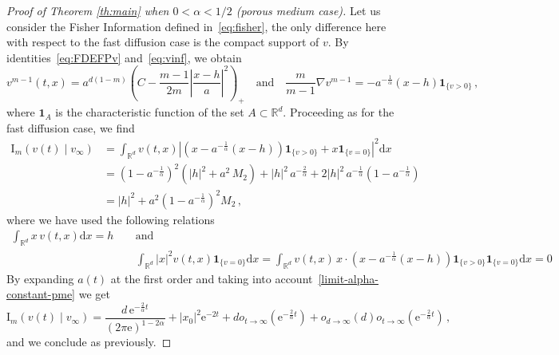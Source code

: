 \documentclass[10pt,reqno]{amsart}
\numberwithin{equation}{section}
\begin{document}
\begin{proof}[Proof of Theorem \ref{th:main} when $0<\alpha<1/2$ (porous medium case)]
Let us consider the Fisher Information defined in~\eqref{eq:fisher}, the only difference here with respect to the fast diffusion case is the compact support of $v$. By identities~\eqref{eq:FDEFPv} and~\eqref{eq:vinf}, we obtain
\begin{equation*}
    v^{m-1}(t,x)=a^{d(1-m)}\left(C-\frac{m-1}{2m}\left|\frac{x-h}{a}\right|^2\right)_{+}\quad\mbox{and}\quad \frac{m}{m-1}\nabla v^{m-1} =-a^{-\frac{1}{\alpha}}\left(x-h\right) \mathbf{1}_{\{v>0\}}\,,
\end{equation*}
where $\mathbf{1}_A$ is the characteristic function of the set $A\subset \mathbb{R}^d$. Proceeding as for the fast diffusion case, we find
\begin{equation*}
    \begin{split}
         \mathrm{I}_m(v(t)\mid v_\infty) & =\int_{\mathbb{R}^d}v(t,x) \left|\left(x-a^{-\frac{1}{\alpha}}(x-h)\right) \mathbf{1}_{\{v>0\}} + x\mathbf{1}_{\{v=0\}} \right|^2 \mathrm{d}x 
          \\ & = (1-a^{-\frac{1}{\alpha}})^2\left(|h|^2 + a^2\, M_2\right) + |h|^2\,a^{-\frac{2}{\alpha}} +2 |h|^2\,a^{-\frac{1}{\alpha}} (1-a^{-\frac{1}{\alpha}})  \\
          & = |h|^2 + a^2 (1-a^{-\frac{1}{\alpha}})^2 M_2\,,
    \end{split}
\end{equation*}
where we have used the following relations
\begin{equation*}
\begin{split}
\int_{\mathbb{R}^d} x\,v(t,x) \mathrm{d}x = h\,\quad&\mbox{and} \\ &\int_{\mathbb{R}^d} |x|^2 v(t,x) \mathbf{1}_{\{v=0\}} \mathrm{d}x = \int_{\mathbb{R}^d} v(t,x) \, x\cdot \left(x-a^{-\frac{1}{\alpha}}(x-h)\right) \mathbf{1}_{\{v>0\}}\mathbf{1}_{\{v=0\}} \mathrm{d}x =   0
\end{split}
\end{equation*}
By expanding $a(t)$ at the first order and taking into account~\eqref{limit-alpha-constant-pme} we get
 \begin{equation*}
      \mathrm{I}_m(v(t)\mid v_\infty) = \frac{d\,\mathrm{e}^{-\frac{2}{\alpha}t}}{(2\pi\mathrm{e})^{1-2\alpha}} + |x_0|^2 \mathrm{e}^{-2t} +  do_{t\rightarrow\infty}(\mathrm{e}^{-\frac{2}{\alpha}t}) + o_{d\rightarrow\infty}(d)o_{t\rightarrow\infty}(\mathrm{e}^{-\frac{2}{\alpha}t})\,,
 \end{equation*}
and we conclude as previously.
\end{proof}
\end{document}
